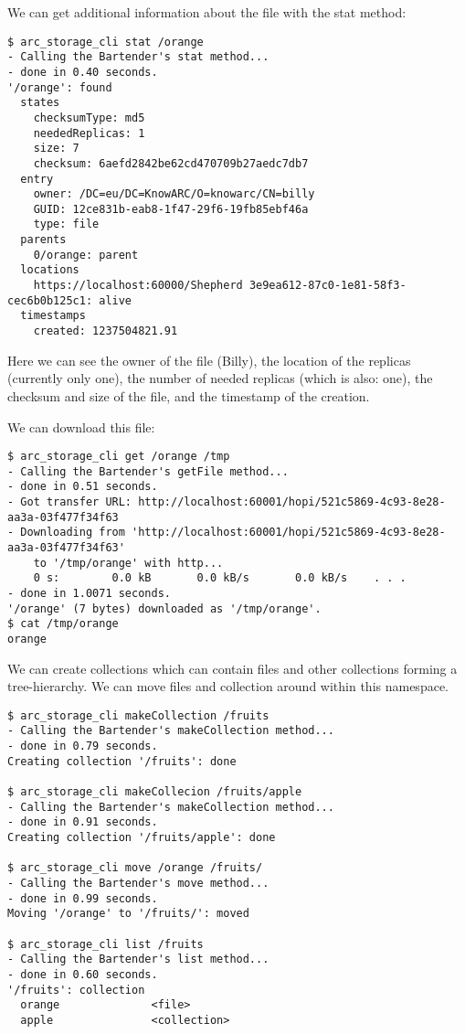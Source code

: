 \documentclass{book}
\begin{document}
We can get additional information about the file with the stat method:

\begin{verbatim}
$ arc_storage_cli stat /orange
- Calling the Bartender's stat method...
- done in 0.40 seconds.
'/orange': found
  states
    checksumType: md5
    neededReplicas: 1
    size: 7
    checksum: 6aefd2842be62cd470709b27aedc7db7
  entry
    owner: /DC=eu/DC=KnowARC/O=knowarc/CN=billy
    GUID: 12ce831b-eab8-1f47-29f6-19fb85ebf46a
    type: file
  parents
    0/orange: parent
  locations
    https://localhost:60000/Shepherd 3e9ea612-87c0-1e81-58f3-cec6b0b125c1: alive
  timestamps
    created: 1237504821.91
\end{verbatim}

Here we can see the owner of the file (Billy), the location of the replicas (currently only one), the number of needed replicas (which is also: one), the checksum and size of the file, and the timestamp of the creation.

We can download this file:

\begin{verbatim}
$ arc_storage_cli get /orange /tmp
- Calling the Bartender's getFile method...
- done in 0.51 seconds.
- Got transfer URL: http://localhost:60001/hopi/521c5869-4c93-8e28-aa3a-03f477f34f63
- Downloading from 'http://localhost:60001/hopi/521c5869-4c93-8e28-aa3a-03f477f34f63'
    to '/tmp/orange' with http...
    0 s:        0.0 kB       0.0 kB/s       0.0 kB/s    . . .       
- done in 1.0071 seconds.
'/orange' (7 bytes) downloaded as '/tmp/orange'.
$ cat /tmp/orange 
orange
\end{verbatim}

We can create collections which can contain files and other collections forming a tree-hierarchy. We can move files and collection around within this namespace.

\begin{verbatim}
$ arc_storage_cli makeCollection /fruits
- Calling the Bartender's makeCollection method...
- done in 0.79 seconds.
Creating collection '/fruits': done

$ arc_storage_cli makeCollecion /fruits/apple
- Calling the Bartender's makeCollection method...
- done in 0.91 seconds.
Creating collection '/fruits/apple': done

$ arc_storage_cli move /orange /fruits/
- Calling the Bartender's move method...
- done in 0.99 seconds.
Moving '/orange' to '/fruits/': moved

$ arc_storage_cli list /fruits
- Calling the Bartender's list method...
- done in 0.60 seconds.
'/fruits': collection
  orange              <file>
  apple               <collection>
\end{verbatim}
\end{document}
